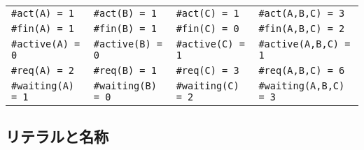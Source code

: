 \documentclass[\pformat,12pt]{jarticle}
\begin{document}
\begin{center}\small
\begin{tabular}{llll}
\texttt{\#act(A) = 1} & \texttt{\#act(B) = 1} & \texttt{\#act(C) = 1}
& \texttt{\#act(A,B,C) = 3}\\
\texttt{\#fin(A) = 1} & \texttt{\#fin(B) = 1} & \texttt{\#fin(C) = 0}
& \texttt{\#fin(A,B,C) = 2}\\
\texttt{\#active(A) = 0} & \texttt{\#active(B) = 0} & 
\texttt{\#active(C) = 1} & \texttt{\#active(A,B,C) = 1}\\
\texttt{\#req(A) = 2} & \texttt{\#req(B) = 1} & \texttt{\#req(C) = 3}
& \texttt{\#req(A,B,C) = 6}\\
\texttt{\#waiting(A) = 1} & \texttt{\#waiting(B) = 0} & 
\texttt{\#waiting(C) = 2} & \texttt{\#waiting(A,B,C) = 3}\\
\end{tabular}
\end{center}




\subsection{リテラルと名称}
\end{document}
